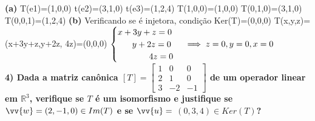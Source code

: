 \documentclass[11pt,a4paper]{article}
\newcommand\tab[1][1.835cm]{\hspace*{#1}}
\newcommand\taba[1][2.55cm]{\hspace*{#1}}
\begin{document}
\begin{flushleft}
\taba \textbf{(a)} T(e1)=(1,0,0)\linebreak
\taba t(e2)=(3,1,0)\linebreak
\taba t(e3)=(1,2,4)\linebreak
\linebreak
\taba T(1,0,0)=(1,0,0)\linebreak
\taba T(0,1,0)=(3,1,0)\linebreak
\taba T(0,0,1)=(1,2,4)\linebreak
\linebreak
\taba \textbf{(b)} Verificando se é injetora, condição Ker(T)=(0,0,0)\linebreak
\taba T(x,y,z)=(x+3y+z,y+2z, 4z)=(0,0,0)\linebreak
\taba $\begin{cases}
x+3y+z=0\\
\hspace{6mm}y+2z=0\\
\hspace{13mm}4z=0
\end{cases}\implies z=0, y=0, x=0$\linebreak
\\ \pagebreak
\tab \textbf{ 4) Dada a matriz canônica $[T]= \begin{bmatrix}
1 & 0 & 0\\ 2 & 1 & 0\\ 3 & -2 & -1 \end{bmatrix}$ de um operador linear em $\mathbb{R}^3$, verifique se $T$ é um isomorfismo e justifique se $\vv{w}=(2,-1,0) \in Im(T)$ e se $\vv{u}= $ $(0,3,4) \in Ker(T)$? }\linebreak


\end{flushleft}
\end{document}
